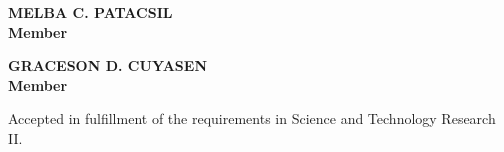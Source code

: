 \vfill

\noindent
\begin{minipage}{0.5\textwidth}%
\begin{center}
\bfseries
MELBA C. PATACSIL\\
Member
\end{center}
\end{minipage}%
\begin{minipage}{0.5\textwidth}%
\begin{center}
\bfseries
GRACESON D. CUYASEN\\
Member
\end{center}
\end{minipage}%

\vfill

Accepted in fulfillment of the requirements in Science and Technology Research II.
\clearpage
\newpage